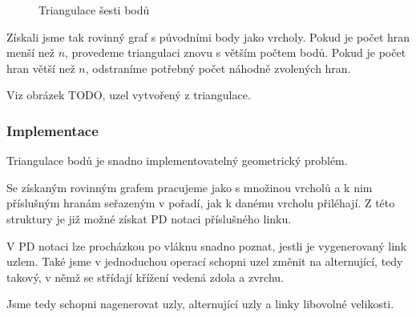 \begin{figure}[h]  
\centering 
{}
\caption{Triangulace šesti bodů}
\end{figure}  

Získali jsme tak rovinný graf s původními body jako vrcholy. Pokud je počet hran menší než $n$, provedeme triangulaci znovu s větším počtem bodů. Pokud je počet hran větší než $n$, odstraníme potřebný počet náhodně zvolených hran.

Viz obrázek TODO, uzel vytvořený z triangulace.

\subsubsection{Implementace}

Triangulace bodů je snadno implementovatelný geometrický problém. 


Se získaným rovinným grafem pracujeme jako s množinou vrcholů a k nim příslušným hranám seřazeným v pořadí, jak k danému vrcholu přiléhají. Z této struktury je již možné získat PD notaci příslušného linku.


V PD notaci lze procházkou po vláknu snadno poznat, jestli je vygenerovaný link uzlem. Také jsme v jednoduchou operací schopni uzel změnit na alternující, tedy takový, v němž se střídají křížení vedená zdola a zvrchu.

Jsme tedy schopni nagenerovat uzly, alternující uzly a linky libovolné velikosti.

